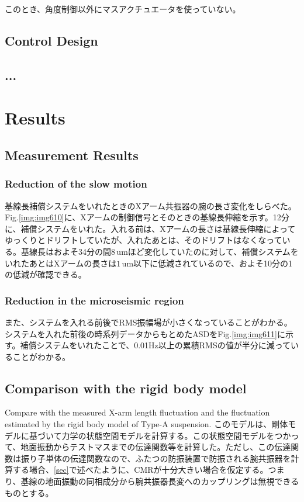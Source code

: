 このとき、角度制御以外にマスアクチュエータを使っていない。


\subsection{Control Design}


\subsection{...}


\section{Results}
\subsection{Measurement Results}
\subsubsection{Reduction of the slow motion}
基線長補償システムをいれたときのXアーム共振器の腕の長さ変化をしらべた。Fig.\ref{img:img610}に、Xアームの制御信号とそのときの基線長伸縮を示す。12分に、補償システムをいれた。入れる前は、Xアームの長さは基線長伸縮によってゆっくりとドリフトしていたが、入れたあとは、そのドリフトはなくなっている。基線長はおよそ34分の間$8\,\mathrm{um}$ほど変化していたのに対して、補償システムをいれたあとはXアームの長さは$1\,\mathrm{um}$以下に低減されているので、およそ10分の1の低減が確認できる。

\subsubsection{Reduction in the microseismic region}
また、システムを入れる前後でRMS振幅場が小さくなっていることがわかる。システムを入れた前後の時系列データからもとめたASDをFig.\ref{img:img611}に示す。補償システムをいれたことで、0.01Hz以上の累積RMSの値が半分に減っていることがわかる。

\subsection{Comparison with the rigid body model}
Compare with the measured X-arm length fluctuation and the fluctuation estimated by the rigid body model of Type-A suspension. このモデルは、剛体モデルに基づいて力学の状態空間モデルを計算する\cite{sekiguchi2016astudy}。この状態空間モデルをつかって、地面振動からテストマスまでの伝達関数等を計算した。ただし、この伝達関数は振り子単体の伝達関数なので、ふたつの防振装置で防振される腕共振器を計算する場合、\cref{sec}で述べたように、CMRが十分大きい場合を仮定する。つまり、基線の地面振動の同相成分から腕共振器長変へのカップリングは無視できるものとする。

